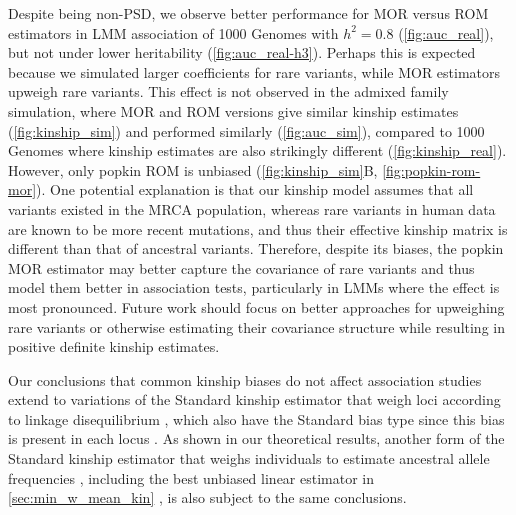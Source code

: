 \documentclass[11pt]{article}
\begin{document}
\begin{linenumbers}
Despite being non-PSD, we observe better performance for MOR versus ROM estimators in LMM association of 1000 Genomes with $h^2=0.8$ (\cref{fig:auc_real}), but not under lower heritability (\cref{fig:auc_real-h3}).
Perhaps this is expected because we simulated larger coefficients for rare variants, while MOR estimators upweigh rare variants.
This effect is not observed in the admixed family simulation, where MOR and ROM versions give similar kinship estimates (\cref{fig:kinship_sim}) and performed similarly (\cref{fig:auc_sim}), compared to 1000 Genomes where kinship estimates are also strikingly different (\cref{fig:kinship_real}).
However, only popkin ROM is unbiased (\cref{fig:kinship_sim}B, \cref{fig:popkin-rom-mor}).
One potential explanation is that our kinship model assumes that all variants existed in the MRCA population, whereas rare variants in human data are known to be more recent mutations, and thus their effective kinship matrix is different than that of ancestral variants.
Therefore, despite its biases, the popkin MOR estimator may better capture the covariance of rare variants and thus model them better in association tests, particularly in LMMs where the effect is most pronounced.
Future work should focus on better approaches for upweighing rare variants or otherwise estimating their covariance structure while resulting in positive definite kinship estimates.

Our conclusions that common kinship biases do not affect association studies extend to variations of the Standard kinship estimator that weigh loci according to linkage disequilibrium \citep{speed_reevaluation_2017, wang_efficient_2017}, which also have the Standard bias type since this bias is present in each locus \citep{ochoa_estimating_2021}.
As shown in our theoretical results, another form of the Standard kinship estimator that weighs individuals to estimate ancestral allele frequencies \pith, including the best unbiased linear estimator in \cref{sec:min_w_mean_kin} \citep{astle_population_2009, thornton_roadtrips:_2010}, is also subject to the same conclusions.


\end{linenumbers}
\end{document}
